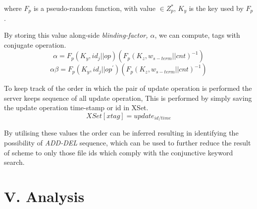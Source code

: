 \documentclass[11pt,a4paper]{report}
\begin{document}
{        where \(F_p\) is a pseudo-random function, with value \(\in Z^*_p\), \(K_y\) is the key used by \(F_p\).

        By storing this value along-side \textit{blinding-factor, \(\alpha\)}, we can compute, tags with conjugate operation.        
        \[\alpha = F_p(K_y, id_j||op)(F_p(K_z, w_{s-term}||cnt)^{-1})\]
        \[\alpha\beta = F_p(K_y, id_j||op^{'})(F_p(K_z, w_{s-term}||cnt)^{-1})\]

        To keep track of the order in which the pair of update operation is performed the server keeps sequence of all update operation, 
        This is performed by simply saving the update operation time-stamp or id in XSet. 
        \[XSet[xtag] = update_{id/time}\]

        By utilising these values the order can be inferred
        resulting in identifying the possibility of \textit{ADD-DEL} sequence, which can be used to further reduce the result of scheme to only those 
        file ids which comply with the conjunctive keyword search.
    }

    \section*{V. Analysis}


    \newpage


\end{document}
